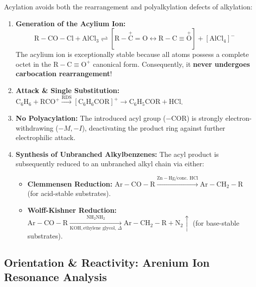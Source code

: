 \documentclass[10pt,a4paper]{article}
\begin{document}
\begin{conceptbox}
Acylation avoids both the rearrangement and polyalkylation defects of alkylation:
\begin{enumerate}[leftmargin=*]
  \item \textbf{Generation of the Acylium Ion:}
  \begin{equation}
    \mathrm{R-CO-Cl} + \mathrm{AlCl_3} \rightleftharpoons [\mathrm{R-\overset{+}{C}=O} \longleftrightarrow \mathrm{R-C\equiv \overset{+}{O}}] + [\mathrm{AlCl_4}]^-
  \end{equation}
  The acylium ion is exceptionally stable because all atoms possess a complete octet in the $\mathrm{R-C\equiv O^+}$ canonical form. Consequently, it \textbf{never undergoes carbocation rearrangement}!
  \item \textbf{Attack \& Single Substitution:} $\mathrm{C_6H_6} + \mathrm{RCO}^+ \xrightarrow{\text{RDS}} [\mathrm{C_6H_6COR}]^+ \to \mathrm{C_6H_5COR} + \mathrm{HCl}$.
  \item \textbf{No Polyacylation:} The introduced acyl group ($-\mathrm{COR}$) is strongly electron-withdrawing ($-M, -I$), deactivating the product ring against further electrophilic attack.
  \item \textbf{Synthesis of Unbranched Alkylbenzenes:} The acyl product is subsequently reduced to an unbranched alkyl chain via either:
  \begin{itemize}
    \item \textbf{Clemmensen Reduction:} $\mathrm{Ar-CO-R} \xrightarrow{\mathrm{Zn-Hg} / \text{conc. } \mathrm{HCl}} \mathrm{Ar-CH_2-R}$ (for acid-stable substrates).
    \item \textbf{Wolff-Kishner Reduction:} $\mathrm{Ar-CO-R} \xrightarrow[\mathrm{KOH}, \text{ethylene glycol, } \Delta]{\mathrm{NH_2NH_2}} \mathrm{Ar-CH_2-R} + \mathrm{N_2}\uparrow$ (for base-stable substrates).
  \end{itemize}
\end{enumerate}
\end{conceptbox}

\subsection{Orientation \& Reactivity: Arenium Ion Resonance Analysis}
\end{document}
